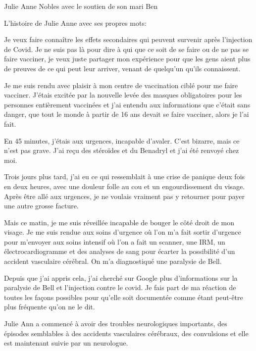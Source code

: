 Julie Anne Nobles avec le soutien de son mari Ben

L'histoire de Julie Anne avec ses propres mots:

Je veux faire connaître les effets secondaires qui peuvent survenir après
l'injection de Covid. Je ne suis pas là pour dire à qui que ce soit de se faire
ou de ne pas se faire vacciner, je veux juste partager mon expérience pour que
les gens aient plus de preuves de ce qui peut leur arriver, venant de quelqu'un
qu'ils connaissent.

Je me suis rendu avec plaisir à mon centre de vaccination ciblé pour me faire
vacciner. J'étais excitée par la nouvelle levée des masques obligatoires pour
les personnes entièrement vaccinées et j'ai entendu aux informations que c'était
sans danger, que tout le monde à partir de 16 ans devait se faire vacciner,
alors je l'ai fait.

En 45 minutes, j'étais aux urgences, incapable d'avaler. C'est bizarre, mais ce
n'est pas grave. J'ai reçu des stéroïdes et du Benadryl et j'ai été renvoyé chez
moi.

Trois jours plus tard, j'ai eu ce qui ressemblait à une crise de panique deux
fois en deux heures, avec une douleur folle au cou et un engourdissement du
visage. Après être allé aux urgences, je ne voulais vraiment pas y retourner
pour payer une autre grosse facture.

Mais ce matin, je me suis réveillée incapable de bouger le côté droit de mon
visage. Je me suis rendue aux soins d'urgence où l'on m'a fait sortir d'urgence
pour m'envoyer aux soins intensif où l'on a fait un scanner, une IRM, un
électrocardiogramme et des analyses de sang pour écarter la possibilité d'un
accident vasculaire cérébral. On m'a diagnostiqué une paralysie de Bell.

Depuis que j'ai appris cela, j'ai cherché sur Google plus d'informations sur la
paralysie de Bell et l'injection contre le covid. Je fais part de ma réaction de
toutes les façons possibles pour qu'elle soit documentée comme étant peut-être
plus fréquente qu'on ne le dit.

Julie Ann a commencé à avoir des troubles neurologiques importants, des épisodes
semblables à des accidents vasculaires cérébraux, des convulsions et elle est
maintenant suivie par un neurologue.

